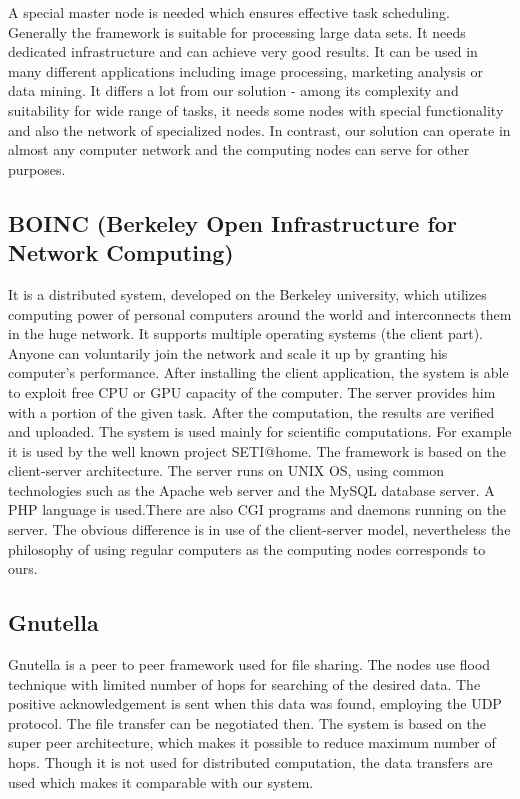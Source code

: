 A special master node is needed which ensures effective task scheduling.
Generally the framework is suitable for processing large data sets. It
needs dedicated infrastructure and can achieve very good results. It can
be used in many different applications including image processing,
marketing analysis or data mining. It differs a lot from our solution -
among its complexity and suitability for wide range of tasks, it needs
some nodes with special functionality and also the network of
specialized nodes. In contrast, our solution can operate in almost any
computer network and the computing nodes can serve for other
purposes.\citep{Hadoop} \citep{MapRed}

\subsection{BOINC (Berkeley Open Infrastructure for Network
Computing)}\label{boinc-berkeley-open-infrastructure-for-network-computing}

It is a distributed system, developed on the Berkeley university, which
utilizes computing power of personal computers around the world and
interconnects them in the huge network. It supports multiple operating
systems (the client part). Anyone can voluntarily join the network and
scale it up by granting his computer's performance. After installing the
client application, the system is able to exploit free CPU or GPU
capacity of the computer. The server provides him with a portion of the
given task. After the computation, the results are verified and
uploaded. The system is used mainly for scientific computations. For
example it is used by the well known project SETI@home. The framework is
based on the client-server architecture. The server runs on UNIX OS,
using common technologies such as the Apache web server and the MySQL
database server. A PHP language is used.There are also CGI programs and
daemons running on the server. The obvious difference is in use of the
client-server model, nevertheless the philosophy of using regular
computers as the computing nodes corresponds to ours.\citep{BOINC}

\subsection{Gnutella}\label{gnutella}

Gnutella is a peer to peer framework used for file sharing. The nodes
use flood technique with limited number of hops for searching of the
desired data. The positive acknowledgement is sent when this data was
found, employing the UDP protocol. The file transfer can be negotiated
then. The system is based on the super peer architecture, which makes it
possible to reduce maximum number of hops. Though it is not used for
distributed computation, the data transfers are used which makes it
comparable with our system.\citep{Gnutella}

